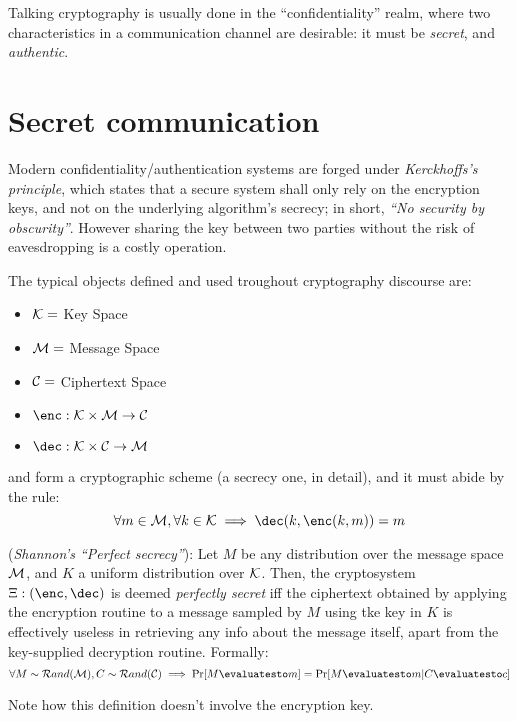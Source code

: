 
Talking cryptography is usually done in the ``confidentiality'' realm, where two characteristics in a communication channel are desirable: it must be \emph{secret}, and \emph{authentic}.

\section{Secret communication}


Modern confidentiality/authentication systems are forged under \emph{Kerckhoffs's principle}, which states that a secure system shall only rely on the encryption keys, and not on the underlying algorithm's secrecy; in short, \emph{``No security by obscurity''}. However sharing the key between two parties without the risk of eavesdropping is a costly operation.

The typical objects defined and used troughout cryptography discourse are:
\begin{itemize}
    \item $\mathcal{K} = $ Key Space
    \item $\mathcal{M} = $ Message Space
    \item $\mathcal{C} = $ Ciphertext Space
    \item $\enc: \K \times \M \to \C$
    \item $\dec: \K \times \C \to \M$
\end{itemize}

\enc and \dec form a cryptographic scheme (a secrecy one, in detail), and it must abide by the rule:
\[
    \forall m \in \M, \forall k \in \K \implies \dec(k, \enc(k, m)) = m
\]

\begin{definition}
    (\textit{Shannon's ``Perfect secrecy''}): Let $M$ be any distribution over the message space $\mathcal{M}$, and $K$ a uniform distribution over $\mathcal{K}$. Then, the cryptosystem $\Xi: (\enc, \dec)$ is deemed \emph{perfectly secret} iff the ciphertext obtained by applying the encryption routine to a message sampled by $M$ using tke key in $K$ is effectively useless in retrieving any info about the message itself, apart from the key-supplied decryption routine. Formally:
    \[
        \forall M \sim \mathcal{R}and(\M), C \sim \mathcal{R}and(\C) \implies \Pr[M \evaluatesto m] = \Pr[M \evaluatesto m|C \evaluatesto c]
    \]
\end{definition}
Note how this definition doesn't involve the encryption key. %

